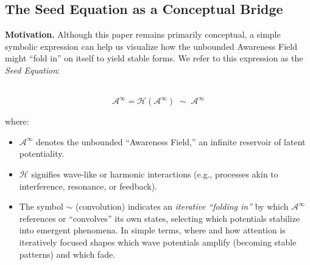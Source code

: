 \documentclass[12pt,a4paper]{article}
\begin{document}
\subsection{The Seed Equation as a Conceptual Bridge}
\label{subsec:seed-equation}

\noindent
\textbf{Motivation.} 
Although this paper remains primarily conceptual, a simple symbolic expression can help us visualize how the unbounded Awareness Field might “fold in” on itself to yield stable forms. We refer to this expression as the \emph{Seed Equation}:


\
\[
\mathscr{A}^\infty = \mathcal{H}(\mathscr{A}^\infty) \;\sim\; \mathscr{A}^\infty
\]



where:
\begin{itemize}
    \item \(\mathscr{A}^\infty\) denotes the unbounded ``Awareness Field,'' an infinite reservoir of latent potentiality.
    \item \(\mathcal{H}\) signifies wave-like or harmonic interactions (e.g., processes akin to interference, resonance, or feedback).
    \item The symbol \(\sim\) (convolution) indicates an \emph{iterative “folding in”} by which \(\mathscr{A}^\infty\) references or “convolves” its own states, selecting which potentials stabilize into emergent phenomena.  In simple terms, where and how attention is iteratively focused shapes which wave potentials amplify (becoming stable patterns) and which fade.
\end{itemize}

\end{document}
